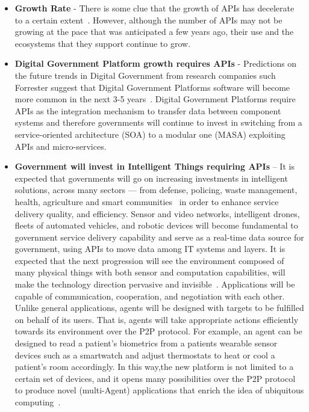 \begin{itemize}
	\item \textbf{Growth Rate} - There is some clue that the growth of APIs has decelerate
	to a certain extent~\citep{api_economy}. However, although the number of APIs may not be
	growing at the pace that was anticipated a few years ago, their use and the
	ecosystems that they support continue to grow.
	
	\item \textbf{Digital Government Platform growth requires APIs} - Predictions on the
	future trends in Digital Government from research companies such Forrester
	suggest that Digital Government Platforms software will become more
	common in the next 3-5 years~\citep{gov_transformation}.
	Digital Government Platforms require APIs as the integration mechanism to transfer
	data between component systems and therefore governments will continue to
	invest in switching from a service-oriented architecture (SOA) to a modular
	one (MASA) exploiting APIs and micro-services.
	
	\item \textbf{Government will invest in Intelligent Things requiring APIs} – It is
	expected that governments will go on increasing investments in intelligent
	solutions, across many sectors — from defense,	policing, waste management, health, agriculture and smart communities~\citep{trends_2017} in order to enhance service delivery quality, and efficiency. Sensor and video networks, intelligent drones, fleets of automated
	vehicles, and robotic devices will become fundamental to government service delivery
	capability and serve as a real-time data source for government, using APIs to
	move data among IT systems and layers. It is expected that the next
	progression will see the environment composed of many physical things with both
	sensor and computation capabilities, will make the technology direction
	pervasive and invisible~\citep{dzone_iot}. Applications will be capable of
	communication, cooperation, and negotiation with each other. Unlike general
	applications, agents will be designed with targets to be fulfilled on behalf
	of its users. That is, agents will take appropriate actions efficiently towards
	its environment over the P2P protocol. For example, an agent can be designed
	to read a patient’s biometrics from a patients wearable sensor devices such as
	a smartwatch and adjust thermostats to heat or cool a patient’s room accordingly.
	In this way,the new platform is not limited to a certain set of devices, and it opens many possibilities over the P2P protocol to produce novel (multi-Agent) applications
	that enrich the idea of ubiquitous computing~\citep{ubiquitous_computing}.
	

\end{itemize}
